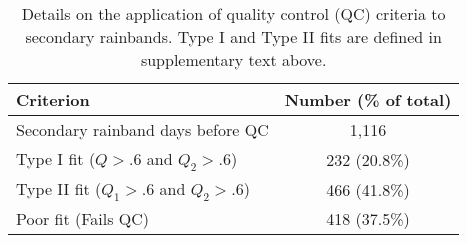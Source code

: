 \documentclass[draft,grl]{agutexSI}
\begin{document}
\begin{table}

\caption{Details on the application of quality control (QC) criteria to secondary rainbands. Type I and Type II fits are defined in supplementary text above.}
\centering

\begin{tabular}{ l c}
	 Criterion & Number (\% of total) \\
	 \hline
	 Secondary rainband days before QC & 1,116 \\
	 Type I fit ($Q>.6$ and $Q_2>.6$) & 232 (20.8\%) \\
	 Type II fit ($Q_1>.6$ and $Q_2>.6$) & 466 (41.8\%) \\
	 Poor fit (Fails QC) & 418 (37.5\%) \\
	 
\end{tabular}
\label{ts3}
\end{table}
\end{document}

